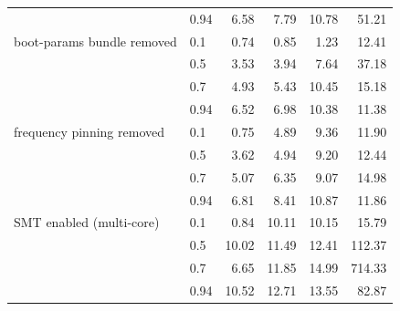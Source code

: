 \begin{tabular}{llrrrr}
 & 0.94 & 6.58 & 7.79 & 10.78 & 51.21 \\
\addlinespace
boot-params bundle removed & 0.1 & 0.74 & 0.85 & 1.23 & 12.41 \\
 & 0.5 & 3.53 & 3.94 & 7.64 & 37.18 \\
 & 0.7 & 4.93 & 5.43 & 10.45 & 15.18 \\
 & 0.94 & 6.52 & 6.98 & 10.38 & 11.38 \\
\addlinespace
frequency pinning removed & 0.1 & 0.75 & 4.89 & 9.36 & 11.90 \\
 & 0.5 & 3.62 & 4.94 & 9.20 & 12.44 \\
 & 0.7 & 5.07 & 6.35 & 9.07 & 14.98 \\
 & 0.94 & 6.81 & 8.41 & 10.87 & 11.86 \\
\addlinespace
SMT enabled (multi-core) & 0.1 & 0.84 & 10.11 & 10.15 & 15.79 \\
 & 0.5 & 10.02 & 11.49 & 12.41 & 112.37 \\
 & 0.7 & 6.65 & 11.85 & 14.99 & 714.33 \\
 & 0.94 & 10.52 & 12.71 & 13.55 & 82.87 \\
\bottomrule
\end{tabular}
